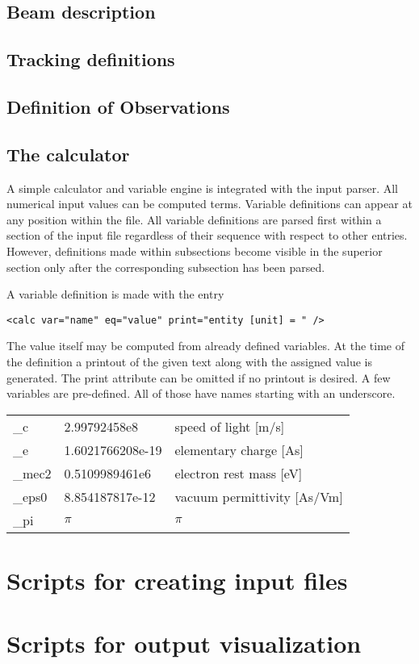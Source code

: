 \documentclass[11pt]{article}
\begin{document}

\subsection{Beam description}


\subsection{Tracking definitions}


\subsection{Definition of Observations}


\subsection{The calculator}

A simple calculator and variable engine is integrated with
the input parser. All numerical input values can be computed terms.
Variable definitions can appear at any position within the file.
All variable definitions are parsed first within a section of the input file
regardless of their sequence with respect to other entries.
However, definitions made within subsections become visible in
the superior section only after the corresponding subsection has been parsed.

A variable definition is made with the entry
\begin{lstlisting}
<calc var="name" eq="value" print="entity [unit] = " />
\end{lstlisting}
The value itself may be computed from already defined variables.
At the time of the definition a printout of the given text along with the
assigned value is generated. The print attribute can be omitted if no printout is desired.
A few variables are pre-defined. All of those have names starting with an underscore.
\\[1ex]
\begin{tabular}{lll}
\_c & 2.99792458e8 & speed of light [m/s] \\
\_e & 1.6021766208e-19 & elementary charge [As] \\
\_mec2 & 0.5109989461e6 & electron rest mass [eV] \\
\_eps0 & 8.854187817e-12 & vacuum permittivity [As/Vm] \\
\_pi & $\pi$ & $\pi$ \\
\end{tabular}

\section{Scripts for creating input files}

\section{Scripts for output visualization}
\end{document}
